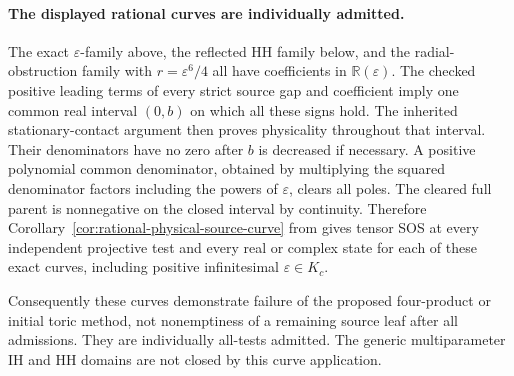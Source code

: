 \paragraph{The displayed rational curves are individually admitted.}
The exact $\varepsilon$-family above, the reflected HH family below,
and the radial-obstruction family with $r=\varepsilon^6/4$ all have
coefficients in $\mathbb R(\varepsilon)$. The checked positive leading
terms of every strict source gap and coefficient imply one common
real interval $(0,b)$ on which all these signs hold. The inherited
stationary-contact argument then proves physicality throughout that
interval. Their denominators have no zero after $b$ is decreased if
necessary. A positive polynomial common denominator, obtained by
multiplying the squared denominator factors including the powers of
$\varepsilon$, clears all poles. The cleared full parent is
nonnegative on the closed interval by continuity. Therefore
Corollary~\ref{cor:rational-physical-source-curve} from
 gives tensor SOS at every
independent projective test and every real or complex state for each
of these exact curves, including positive infinitesimal
$\varepsilon\in K_c$.

Consequently these curves demonstrate failure of the proposed
four-product or initial toric method, not nonemptiness of a remaining
source leaf after all admissions. They are individually all-tests
admitted. The generic multiparameter IH and HH domains are not closed
by this curve application.
